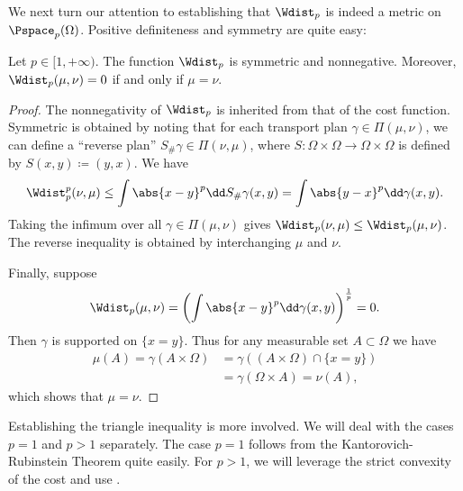 \documentclass[oneside,reqno,letterpaper]{amsart}
\begin{document}
We next turn our attention to establishing that \(\Wdist_p\) is indeed a metric on \(\Pspace_p(\Omega)\).
Positive definiteness and symmetry are quite easy:
\begin{proposition}\label{prop:Wdist-pos-def-sym}
  Let \(p \in [1, +\infty)\).
  The function \(\Wdist_p\) is symmetric and nonnegative.
  Moreover, \(\Wdist_p(\mu, \nu) = 0\) if and only if \(\mu = \nu\).
\end{proposition}
\begin{proof}
  The nonnegativity of \(\Wdist_p\) is inherited from that of the cost function.
  Symmetric is obtained by noting that for each transport plan \(\gamma \in \Pi(\mu, \nu)\), we can define a ``reverse plan'' \(S_{\#} \gamma \in \Pi(\nu, \mu)\), where \(S: \Omega \times \Omega \to \Omega \times \Omega\) is defined by \(S(x, y) \coloneqq (y, x)\).
  We have
  \[
    \Wdist_p^p(\nu, \mu)
    \leq \int \abs{x - y}^p \dd S_{\#} \gamma(x, y)
    = \int \abs{y - x}^p \dd \gamma(x, y).
  \]
  Taking the infimum over all \(\gamma \in \Pi(\mu, \nu)\) gives \(\Wdist_p(\nu, \mu) \leq \Wdist_p(\mu, \nu)\).
  The reverse inequality is obtained by interchanging \(\mu\) and \(\nu\).

  Finally, suppose
  \[
    \Wdist_p(\mu, \nu)
    = \left( \int \abs{x - y}^p \dd \gamma(x, y) \right)^{\frac{1}{p}}
    = 0.
  \]
  Then \(\gamma\) is supported on \(\{x = y\}\).
  Thus for any measurable set \(A \subset \Omega\) we have
  \begin{align*}
    \mu(A)
    = \gamma(A \times \Omega)
    &= \gamma\left( (A \times \Omega) \cap \{x = y\} \right) \\
    &= \gamma(\Omega \times A)
    = \nu(A),
  \end{align*}
  which shows that \(\mu = \nu\).
\end{proof}


Establishing the triangle inequality is more involved.
We will deal with the cases \(p = 1\) and \(p > 1\) separately.
The case \(p = 1\) follows from the Kantorovich-Rubinstein Theorem quite easily.
For \(p > 1\), we will leverage the strict convexity of the cost and use .
\end{document}
